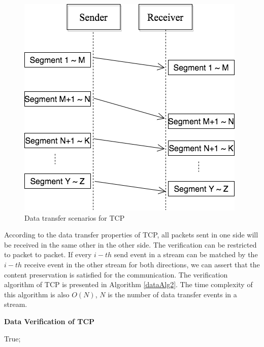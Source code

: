\documentclass[12pt,oneside]{book}
\begin{document}
\begin{figure}[H]
\centerline{\includegraphics[scale=0.4]{Figures/tcp}}
 \caption{Data transfer scenarios for TCP}
\label{tcp}
\end{figure}

According to the data transfer properties of TCP, all packets sent in one side will be received in the same other in the other side. The verification can be restricted to packet to packet. If every $i-th$ send event in a stream can be matched by the $i-th$ receive event in the other stream for both directions, we can assert that the content preservation is satisfied for the communication. The verification algorithm of TCP is presented in Algorithm \ref{dataAlg2}. The time complexity of this algorithm is also $O(N)$, $N$ is the number of data transfer events in a stream.

\begin{algorithm}[H]
\DontPrintSemicolon
\caption{{\bf Data Verification of TCP} \label{dataAlg2}}
\;
 \KwRet True;\;
\end{algorithm} 
\end{document}
